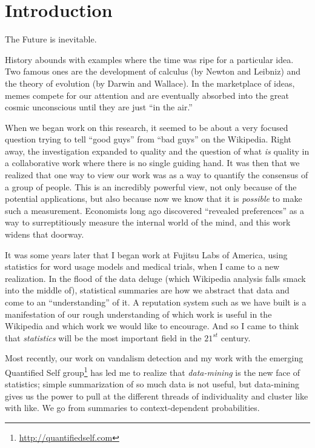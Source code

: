 \section{Introduction}

The Future is inevitable.

History abounds with examples where the time was ripe for a particular idea.
Two famous ones are the development of calculus (by Newton and Leibniz)
and the theory of evolution (by Darwin and Wallace).
In the marketplace of ideas, memes compete for our attention and
are eventually absorbed into the great cosmic unconscious until
they are just ``in the air.''

When we began work on this research, it seemed to be about a very focused
question trying to tell ``good guys'' from ``bad guys'' on the Wikipedia.
Right away, the investigation expanded to quality and the question of what
\textit{is} quality in a collaborative work where there is no single
guiding hand.
It was then that we realized that one way to view our work was as a
way to quantify the consensus of a group of people.
This is an incredibly powerful view, not only because of the potential
applications, but also because now we know that it is \textit{possible}
to make such a measurement.
Economists long ago discovered ``revealed preferences''
as a way to surreptitiously measure the internal world of the mind,
and this work widens that doorway.

It was some years later that I began work at Fujitsu Labs of America,
using statistics for word usage models and medical trials,
when I came to a new realization.
In the flood of the data deluge (which Wikipedia analysis falls smack
into the middle of), statistical summaries are how we abstract that data
and come to an ``understanding'' of it.
A reputation system such as we have built is a manifestation of our
rough understanding of which work is useful in the Wikipedia and
which work we would like to encourage.
And so I came to think that \textit{statistics} will be the
most important field in the $21^{st}$ century.

Most recently, our work on vandalism detection and my work with the
emerging Quantified Self group\footnote{\url{http://quantifiedself.com}}
has led me to realize that
\textit{data-mining} is the new face of statistics; simple summarization
of so much data is not useful, but data-mining gives us the power to
pull at the different threads of individuality and cluster like with like.
We go from summaries to context-dependent probabilities.


